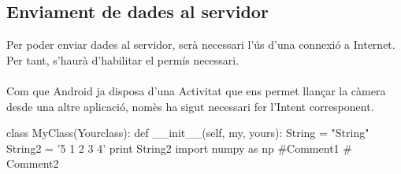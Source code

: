 	\subsection{Enviament de dades al servidor}
		Per poder enviar dades al servidor, serà necessari l'ús d'una connexió a Internet. Per tant, s'haurà d'habilitar el permís necessari.\\\\
		Com que Android ja disposa d'una Activitat que ens permet llançar la càmera desde una altre aplicació, nomès ha sigut necessari fer l'Intent corresponent.\\
		\begin{java}
class MyClass(Yourclass):
  def __init__(self, my, yours):
    String = "String"
    String2 = '5 1 2 3 4'
    print String2
import numpy as np #Comment1
  # Comment2
		\end{java}
